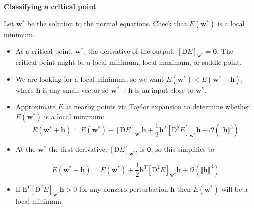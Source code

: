 \documentclass[12pt,letterpaper,noanswers]{exam}
\newcommand{\vc}[1]{\boldsymbol{#1}}
\begin{document}
    
   
    









\noindent\textbf{Classifying a critical point}

Let $\vc{w}^*$ be the solution to the normal equations.  Check that $E(\vc{w}^*)$ is a local minimum.
  \vspace{0.2cm}

\begin{tcolorbox}
\begin{itemize}
\itemsep0pt
    \item At a critical point, $\vc{w}^*$, the derivative of the output, $\left[\text{D}E\right]_{\vc{w}^*} = \vc{0}$.  The critical point might be a local minimum, local maximum, or saddle point.
    \item We are looking for a local minimum, so we want $E(\vc{w}^*) < E(\vc{w}^*+\vc{h})$, where $\vc{h}$ is any small vector so $\vc{w}^*+\vc{h}$ is an input close to $\vc{w}^*$.
    
    \item Approximate $E$ at nearby points via Taylor expansion to determine whether $E(\vc{w}^*)$ is a local minimum:
    \[E(\vc{w}^*+\vc{h}) = E(\vc{w}^*) + \left[\text{D}E\right]_{\vc{w}^*}\vc{h} + \frac{1}{2} \vc{h}^T\left[\text{D}^2E\right]_{\vc{w}^*}\vc{h} + \mathcal{O}(\Vert\vc{h}\Vert^3)\]
        \end{itemize}
\end{tcolorbox}


    \begin{tcolorbox}
    \begin{itemize}
  \item  
    At the $\vc{w}^*$ the first derivative, $\left[\text{D}E\right]_{\vc{w}^*}$, is $\vc{0}$, so this simplifies to 
    
    \[E(\vc{w}^*+\vc{h}) = E(\vc{w}^*) +  \frac{1}{2} \vc{h}^T\left[\text{D}^2E\right]_{\vc{w}^*}\vc{h} + \mathcal{O}(\Vert\vc{h}\Vert^3)\]
    \item If $ \vc{h}^T\left[\text{D}^2E\right]_{\vc{w}^*}\vc{h}>0$ for any nonzero perturbation $\vc{h}$ then $E(\vc{w}^*)$ will be a local minimum.
    \end{itemize}
\end{tcolorbox}
\end{document}
